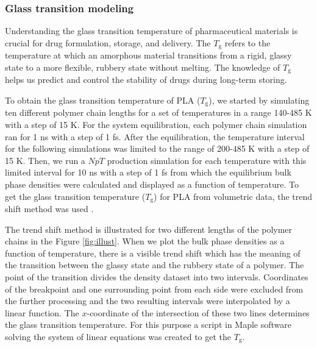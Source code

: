 \subsubsection{Glass transition modeling}
Understanding the glass transition temperature of pharmaceutical materials is crucial for drug formulation, storage, and delivery. The $T_\text{g}$ refers to the temperature at which an amorphous material transitions from a rigid, glassy state to a more flexible, rubbery state without melting. The knowledge of $T_\text{g}$ helps us predict and control the stability of drugs during long-term storing.  

To obtain the glass transition temperature of PLA ($T_\mathrm{g}$), we started by simulating ten different polymer chain lengths for a set of temperatures in a range 140-485 K with a step of 15 K. For the system equilibration, each polymer chain simulation ran for 1 ns with a step of 1 fs. After the equilibration, the temperature interval for the following simulations was limited to the range of 200-485 K with a step of 15 K. Then, we run a $NpT$ production simulation for each temperature with this limited interval for 10 ns with a step of 1 fs from which the equilibrium bulk phase densities were calculated and displayed as a function of temperature. To get the glass transition temperature ($T_\mathrm{g}$) for PLA from volumetric data, the trend shift method was used \cite{klajmon_does_2022}. 

The trend shift method is illustrated for two different lengths of the polymer chains in the Figure \ref{fig:illust}. When we plot the bulk phase densities as a function of temperature, there is a visible trend shift which has the meaning of the transition between the glassy state and the rubbery state of a polymer. The point of the transition divides the density dataset into two intervals. Coordinates of the breakpoint and one surrounding point from each side were excluded from the further processing and the two resulting intervals were interpolated by a linear function. The $x$-coordinate of the intersection of these two lines determines the glass transition temperature. For this purpose a script in Maple software solving the system of linear equations was created to get the $T_\mathrm{g}$.

